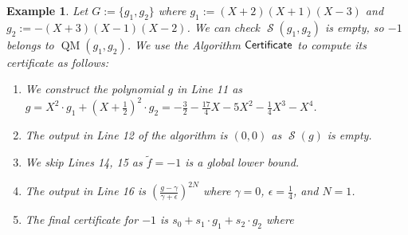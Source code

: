 \documentclass[preprint,12pt,authoryear]{elsarticle}
\newtheorem{example}[theorem]{Example}
\newenvironment{example1}
  {\begin{example}\rm}
  {\end{example}}
\DeclareMathOperator{\quadmod}{QM}
\DeclareMathOperator{\semialgebraic}{\mathcal{S}}
\DeclareMathOperator{\algPutinar}{\sf Certificate}
\begin{document}
\begin{example1}
  \th\label{sec:certificates--1} Let $G := \{g_1, g_2\}$ where
  $g_1 := (X + 2)(X + 1)(X - 3)$ and $g_2 := -(X + 3)(X - 1)(X - 2)$. We can
  check $\semialgebraic(g_1, g_2)$ is empty, so $-1$ belongs to
  $\quadmod(g_1, g_2)$. We use the Algorithm $\algPutinar$ to compute its
  certificate as follows:

  \begin{enumerate}
  \item We construct the polynomial $g$ in Line 11 as
    $g = X^2 \cdot g_1 + (X + \frac{1}{2})^2 \cdot g_2 = -\frac{3}{2} -
    \frac{17}{4}X - 5 X^2 - \frac{1}{4}X^3 - X^4$.
\item The output in Line 12 of the algorithm is $(0, 0)$ as
    $\semialgebraic(g)$ is empty.
  \item We skip Lines 14, 15 as $\tilde{f} = -1$ is a global lower bound.
  \item The output in Line 16 is
    $\left(\frac{g - \gamma}{\gamma + \epsilon}\right)^{2N}$ where $\gamma =
    0$, $\epsilon= \frac{1}{4}$, and $N = 1$.
  \item The final certificate for $-1$ is $s_0 + s_1 \cdot g_1 + s_2 \cdot g_2$
    where 


\end{enumerate}
\end{example1}
\end{document}
